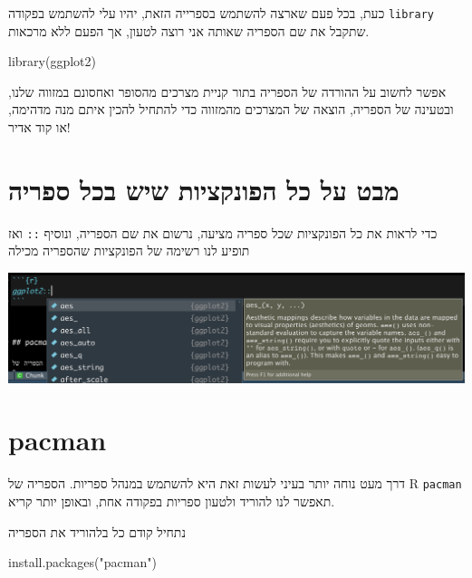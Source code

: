 \documentclass[
]{book}
\newenvironment{Shaded}{\begin{snugshade}}{\end{snugshade}}
\newcommand{\FunctionTok}[1]{\textcolor[rgb]{0.00,0.00,0.00}{#1}}
\newcommand{\NormalTok}[1]{#1}
\newcommand{\StringTok}[1]{\textcolor[rgb]{0.31,0.60,0.02}{#1}}
\begin{document}
כעת, בכל פעם שארצה להשתמש בספרייה הזאת, יהיו עלי להשתמש בפקודה
\texttt{library}
שתקבל את שם הספריה שאותה אני רוצה לטעון, אך הפעם ללא מרכאות.

\begin{Shaded}
\begin{Highlighting}[]
\FunctionTok{library}\NormalTok{(ggplot2)}
\end{Highlighting}
\end{Shaded}

אפשר לחשוב על ההורדה של הספריה בתור קניית מצרכים מהסופר ואחסונם במזווה שלנו, ובטעינה של הספריה, הוצאה של המצרכים מהמזווה כדי להתחיל להכין איתם מנה מדהימה, או קוד אדיר!

\hypertarget{ux5deux5d1ux5d8-ux5e2ux5dc-ux5dbux5dc-ux5d4ux5e4ux5d5ux5e0ux5e7ux5e6ux5d9ux5d5ux5ea-ux5e9ux5d9ux5e9-ux5d1ux5dbux5dc-ux5e1ux5e4ux5e8ux5d9ux5d4}{%
\section{מבט על כל הפונקציות שיש בכל ספריה}\label{ux5deux5d1ux5d8-ux5e2ux5dc-ux5dbux5dc-ux5d4ux5e4ux5d5ux5e0ux5e7ux5e6ux5d9ux5d5ux5ea-ux5e9ux5d9ux5e9-ux5d1ux5dbux5dc-ux5e1ux5e4ux5e8ux5d9ux5d4}}

כדי לראות את כל הפונקציות שכל ספריה מציעה,
נרשום את שם הספריה, ונוסיף
\texttt{::}
ואז תופיע לנו רשימה של הפונקציות שהספריה מכילה

\includegraphics{07-packages_insertimage_1.png}

\hypertarget{pacman}{%
\section{pacman}\label{pacman}}

דרך מעט נוחה יותר בעיני לעשות זאת היא להשתמש במנהל ספריות. הספריה של
R
\texttt{pacman}
תאפשר לנו להוריד ולטעון ספריות בפקודה אחת, ובאופן יותר קריא.

נתחיל קודם כל בלהוריד את הספריה

\begin{Shaded}
\begin{Highlighting}[]
\FunctionTok{install.packages}\NormalTok{(}\StringTok{"pacman"}\NormalTok{)}
\end{Highlighting}
\end{Shaded}
\end{document}
